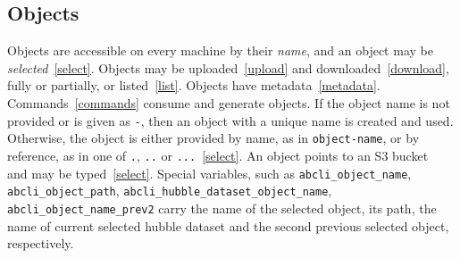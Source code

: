 \subsection{Objects}
\label{objects}

Objects are accessible on every machine by their \emph{name}, and an object may be \emph{selected}~\ref{select}. Objects may be uploaded~\ref{upload} and downloaded~\ref{download}, fully or partially, or listed~\ref{list}. Objects have metadata~\ref{metadata}. Commands~\ref{commands} consume and generate objects. If the object name is not provided or is given as \texttt{-}, then an object with a unique name is created and used. Otherwise, the object is either provided by name, as in \texttt{object-name}, or by reference, as in one of \texttt{.}, \texttt{..} or \texttt{...}~\ref{select}. An object points to an S3 bucket~ and may be typed~\ref{select}. Special variables, such as \texttt{abcli\_object\_name}, \texttt{abcli\_object\_path}, \texttt{abcli\_hubble\_dataset\_object\_name}, \texttt{abcli\_object\_name\_prev2} carry the name of the selected object, its path, the name of current selected hubble dataset and the second previous selected object, respectively.







